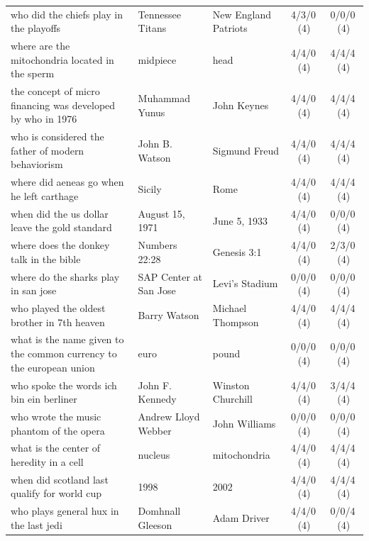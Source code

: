 \begin{longtable}{@{}p{6.6cm}p{2.9cm}p{2.9cm}cc@{}}
\rowcolor{neutralgray}
who did the chiefs play in the playoffs & Tennessee Titans & New England Patriots & 4/3/0\,\footnotesize(4) & 0/0/0\,\footnotesize(4) \\
where are the mitochondria located in the sperm & midpiece & head & 4/4/0\,\footnotesize(4) & 4/4/4\,\footnotesize(4) \\
\rowcolor{neutralgray}
the concept of micro financing was developed by who in 1976 & Muhammad Yunus & John Keynes & 4/4/0\,\footnotesize(4) & 4/4/4\,\footnotesize(4) \\
who is considered the father of modern behaviorism & John B. Watson & Sigmund Freud & 4/4/0\,\footnotesize(4) & 4/4/4\,\footnotesize(4) \\
\rowcolor{neutralgray}
where did aeneas go when he left carthage & Sicily & Rome & 4/4/0\,\footnotesize(4) & 4/4/4\,\footnotesize(4) \\
when did the us dollar leave the gold standard & August 15, 1971 & June 5, 1933 & 4/4/0\,\footnotesize(4) & 0/0/0\,\footnotesize(4) \\
\rowcolor{neutralgray}
where does the donkey talk in the bible & Numbers 22:28 & Genesis 3:1 & 4/4/0\,\footnotesize(4) & 2/3/0\,\footnotesize(4) \\
where do the sharks play in san jose & SAP Center at San Jose & Levi's Stadium & 0/0/0\,\footnotesize(4) & 0/0/0\,\footnotesize(4) \\
\rowcolor{neutralgray}
who played the oldest brother in 7th heaven & Barry Watson & Michael Thompson & 4/4/0\,\footnotesize(4) & 4/4/4\,\footnotesize(4) \\
what is the name given to the common currency to the european union & euro & pound & 0/0/0\,\footnotesize(4) & 0/0/0\,\footnotesize(4) \\
\rowcolor{neutralgray}
who spoke the words ich bin ein berliner & John F. Kennedy & Winston Churchill & 4/4/0\,\footnotesize(4) & 3/4/4\,\footnotesize(4) \\
who wrote the music phantom of the opera & Andrew Lloyd Webber & John Williams & 0/0/0\,\footnotesize(4) & 0/0/0\,\footnotesize(4) \\
\rowcolor{neutralgray}
what is the center of heredity in a cell & nucleus & mitochondria & 4/4/0\,\footnotesize(4) & 4/4/4\,\footnotesize(4) \\
when did scotland last qualify for world cup & 1998 & 2002 & 4/4/0\,\footnotesize(4) & 4/4/4\,\footnotesize(4) \\
\rowcolor{neutralgray}
who plays general hux in the last jedi & Domhnall Gleeson & Adam Driver & 4/4/0\,\footnotesize(4) & 0/0/4\,\footnotesize(4) \\

\end{longtable}

